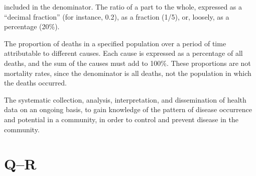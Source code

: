 \documentclass[11pt]{article}
\begin{document}
\begin{description}
included in the denominator. The ratio of a part to the whole,
expressed as a ``decimal fraction'' (for instance, 0.2), as a
fraction (1/5), or, loosely, as a percentage (20\%).
\item[Proportionate mortality] The proportion of deaths in a
specified population over a period of time attributable to
different causes. Each cause is expressed as a percentage of all
deaths, and the sum of the causes must add to 100\%. These
proportions are not mortality rates, since the denominator is
all deaths, not the population in which the deaths occurred.
\item[Public health surveillance] The systematic collection,
analysis, interpretation, and dissemination of health data on an
ongoing basis, to gain knowledge of the pattern of disease
occurrence and potential in a community, in order to control and
prevent disease in the community.
\end{description}

\section*{Q--R}
\end{document}
